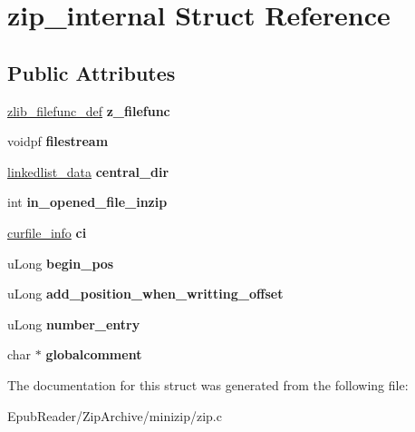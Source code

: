\hypertarget{structzip__internal}{\section{zip\-\_\-internal Struct Reference}
\label{structzip__internal}
}
\subsection*{Public Attributes}
\begin{DoxyCompactItemize}
\item 
\hypertarget{structzip__internal_a52b481ed001fdb87cc389c128b8c0f6e}{\hyperlink{structzlib__filefunc__def__s}{zlib\-\_\-filefunc\-\_\-def} {\bfseries z\-\_\-filefunc}}\label{structzip__internal_a52b481ed001fdb87cc389c128b8c0f6e}

\item 
\hypertarget{structzip__internal_a1444d3938300b2fa4e8f1e2a99475138}{voidpf {\bfseries filestream}}\label{structzip__internal_a1444d3938300b2fa4e8f1e2a99475138}

\item 
\hypertarget{structzip__internal_ae63acf37b5a3719b3eae7802115ed73c}{\hyperlink{structlinkedlist__data__s}{linkedlist\-\_\-data} {\bfseries central\-\_\-dir}}\label{structzip__internal_ae63acf37b5a3719b3eae7802115ed73c}

\item 
\hypertarget{structzip__internal_a98dbf3927482a45adefcd32d12bd7840}{int {\bfseries in\-\_\-opened\-\_\-file\-\_\-inzip}}\label{structzip__internal_a98dbf3927482a45adefcd32d12bd7840}

\item 
\hypertarget{structzip__internal_ab087c0930e1deeaf9f3dc9199d88c18f}{\hyperlink{structcurfile__info}{curfile\-\_\-info} {\bfseries ci}}\label{structzip__internal_ab087c0930e1deeaf9f3dc9199d88c18f}

\item 
\hypertarget{structzip__internal_a913be8e62247a3fbe1ffcdf7c03d0248}{u\-Long {\bfseries begin\-\_\-pos}}\label{structzip__internal_a913be8e62247a3fbe1ffcdf7c03d0248}

\item 
\hypertarget{structzip__internal_a6cd048a07f19de1144c9a7edc3645422}{u\-Long {\bfseries add\-\_\-position\-\_\-when\-\_\-writting\-\_\-offset}}\label{structzip__internal_a6cd048a07f19de1144c9a7edc3645422}

\item 
\hypertarget{structzip__internal_a8415937c4a5b2afc0adde407d59f2750}{u\-Long {\bfseries number\-\_\-entry}}\label{structzip__internal_a8415937c4a5b2afc0adde407d59f2750}

\item 
\hypertarget{structzip__internal_a8a49f83da0affc89cfc541ab38e72471}{char $\ast$ {\bfseries globalcomment}}\label{structzip__internal_a8a49f83da0affc89cfc541ab38e72471}

\end{DoxyCompactItemize}


The documentation for this struct was generated from the following file\-:\begin{DoxyCompactItemize}
\item 
Epub\-Reader/\-Zip\-Archive/minizip/zip.\-c\end{DoxyCompactItemize}
